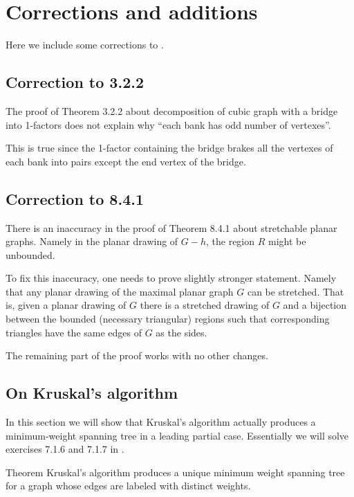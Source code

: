 \chapter{Corrections and additions}

Here we include some corrections to \cite{pearls}.

\section*{Correction to 3.2.2}

The proof of Theorem 3.2.2 about decomposition of cubic graph with a bridge into 1-factors
does not explain why ``each bank has odd number of vertexes''.

This is true since the 1-factor containing the bridge brakes all the vertexes of each bank into pairs except the end vertex of the bridge.


\section*{Correction to 8.4.1}

There is an inaccuracy in the proof of Theorem 8.4.1 about stretchable planar graphs.
Namely in the planar drawing of $G-h$, the region $R$ might be unbounded.

To fix this inaccuracy, one needs to prove slightly stronger statement.
Namely that any planar drawing of the maximal planar graph $G$ can be stretched.
That is, given a planar drawing of $G$ there is a stretched drawing of $G$ 
and a bijection between the bounded (necessary triangular) regions such that corresponding triangles have the same edges of $G$ as the sides.

The remaining part of the proof works with no other changes.

\section*{On Kruskal's algorithm}

In this section we will show that Kruskal’s algorithm actually produces a minimum-weight spanning tree in a leading partial case.
Essentially we will solve exercises 7.1.6 and 7.1.7 in \cite{pearls}. 

\begin{thm}{Theorem}
Kruskal’s algorithm produces a unique minimum weight spanning tree for a graph whose edges are labeled with
distinct weights. 

\end{thm}

